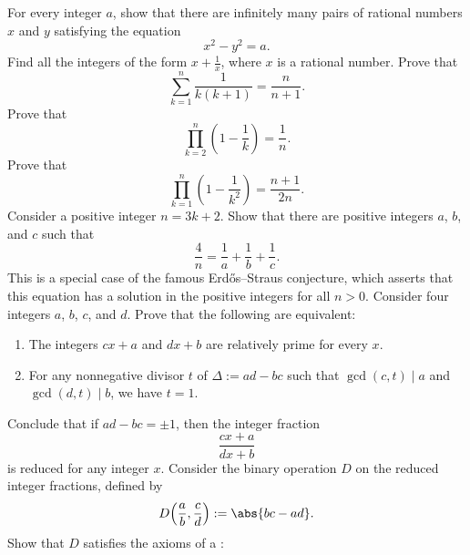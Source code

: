 \exercises

\begin{routine}
  \exercise For every integer $a$, show that there are infinitely many pairs of rational numbers $x$ and $y$ satisfying the equation
  \begin{equation*}
    x^2-y^2=a.
  \end{equation*}
  \exercise Find all the integers of the form $x+\frac{1}{x}$, where $x$ is a rational number.
  \exercise Prove that
  \begin{equation*}
    \sum_{k=1}^n\frac{1}{k(k+1)}=\frac{n}{n+1}.
  \end{equation*}
  \exercise Prove that
  \begin{equation*}
    \prod_{k=2}^n\left(1-\frac{1}{k}\right)=\frac{1}{n}.
  \end{equation*}
  \exercise Prove that
  \begin{equation*}
    \prod_{k=1}^n\left(1-\frac{1}{k^2}\right)=\frac{n+1}{2n}.
  \end{equation*}
  \exercise Consider a positive integer $n=3k+2$. Show that there are positive integers $a$, $b$, and $c$ such that
  \begin{equation*}
    \frac{4}{n}=\frac{1}{a}+\frac{1}{b}+\frac{1}{c}.
  \end{equation*}
  This is a special case of the famous Erd\H{o}s--Straus conjecture, which asserts that this equation has a solution in the positive integers for all $n>0$.
  \exercise Consider four integers $a$, $b$, $c$, and $d$. Prove that the following are equivalent:
  \begin{enumerate}
  \item The integers $cx+a$ and $dx+b$ are relatively prime for every $x$.
  \item For any nonnegative divisor $t$ of $\Delta:=ad-bc$ such that $\gcd(c,t)\mid a$ and $\gcd(d,t)\mid b$, we have $t=1$.
  \end{enumerate}
  Conclude that if $ad-bc=\pm 1$, then the integer fraction
  \begin{equation*}
    \frac{cx+a}{dx+b}
  \end{equation*}
  is reduced for any integer $x$.
  \exercise Consider the binary operation $D$ on the reduced integer fractions, defined by
  \begin{equation*}
    D\Big(\frac{a}{b},\frac{c}{d}\Big) := \abs{bc-ad}.
  \end{equation*}
  Show that $D$ satisfies the axioms of a :
  \begin{enumerate}

\end{enumerate}
\end{routine}
